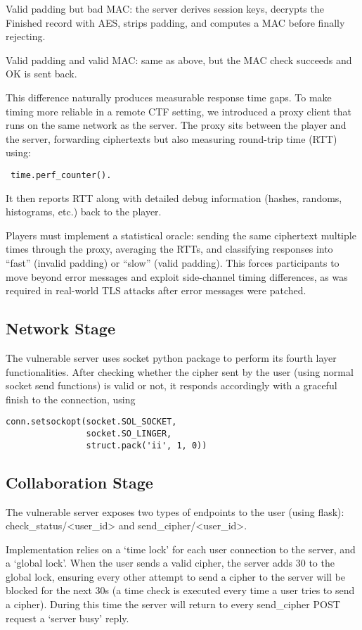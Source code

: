\documentclass[sigconf]{acmart}
\begin{document}
Valid padding but bad MAC: the server derives session keys, decrypts the Finished record with AES, strips padding, and computes a MAC before finally rejecting.

Valid padding and valid MAC: same as above, but the MAC check succeeds and OK is sent back.

This difference naturally produces measurable response time gaps. To make timing more reliable in a remote CTF setting, we introduced a proxy client that runs on the same network as the server. The proxy sits between the player and the server, forwarding ciphertexts but also measuring round-trip time (RTT) using: \begin{verbatim} time.perf_counter().\end{verbatim}
It then reports RTT along with detailed debug information (hashes, randoms, histograms, etc.) back to the player.

Players must implement a statistical oracle: sending the same ciphertext multiple times through the proxy, averaging the RTTs, and classifying responses into “fast” (invalid padding) or “slow” (valid padding). This forces participants to move beyond error messages and exploit side-channel timing differences, as was required in real-world TLS attacks after error messages were patched.

\subsection{Network Stage}
The vulnerable server uses socket python package to perform its fourth layer functionalities. After checking whether the cipher sent by the user (using normal socket send functions) is valid or not, it responds accordingly with a graceful finish to the connection, using \begin{verbatim}
conn.setsockopt(socket.SOL_SOCKET, 
                socket.SO_LINGER,
                struct.pack('ii', 1, 0))
\end{verbatim}

\subsection{Collaboration Stage}
The vulnerable server exposes two types of endpoints to the user (using flask): check\_status/<user\_id> and send\_cipher/<user\_id>.

Implementation relies on a ‘time lock’ for each user connection to the server, and a ‘global lock’. When the user sends a valid cipher, the server adds 30 to the global lock, ensuring every other attempt to send a cipher to the server will be blocked for the next 30s (a time check is executed every time a user tries to send a cipher). During this time the server will return to every send\_cipher POST request a ‘server busy’ reply. 
\end{document}
